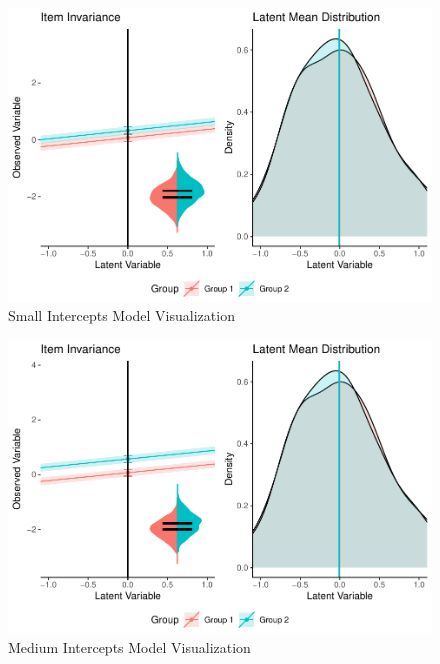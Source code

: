 \documentclass[
  man]{apa6}
\begin{document}
\begin{figure}
\centering
\includegraphics{manuscript_files/figure-latex/small-int-pic-1.pdf}
\caption{\label{fig:small-int-pic}Small Intercepts Model Visualization}
\end{figure}

\begin{figure}
\centering
\includegraphics{manuscript_files/figure-latex/med-int-pic-1.pdf}
\caption{\label{fig:med-int-pic}Medium Intercepts Model Visualization}
\end{figure}
\end{document}
